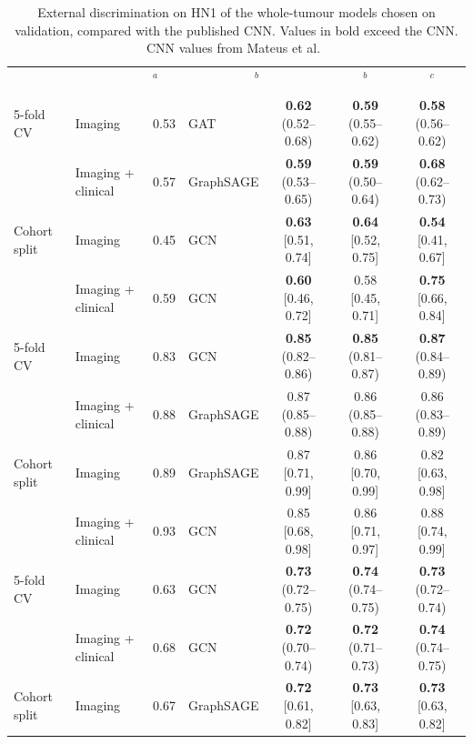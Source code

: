 \begin{table}[!tp]
\centering
\caption{External discrimination on HN1 of the whole-tumour models chosen on validation, compared with the published CNN. Values in bold exceed the CNN. CNN values from Mateus et al.~\cite{mateus2023}}\label{tab:main}
\tabsetup
\begin{tabularx}{\textwidth}{Q{1.9cm} Q{2.6cm} P{1.2cm} Q{1.7cm} C C C}
\toprule
 & & $^{a}$ &  & $^{b}$ & $^{c}$ \\
\cmidrule(lr){4-5}
 &  &  &  &  &  &  \\
\midrule
{}
5-fold CV & Imaging & 0.53 & GAT & \textbf{0.62} (0.52--0.68) & \textbf{0.59} (0.55--0.62) & \textbf{0.58} (0.56--0.62) \\
 & Imaging + clinical & 0.57 & GraphSAGE & \textbf{0.59} (0.53--0.65) & \textbf{0.59} (0.50--0.64) & \textbf{0.68} (0.62--0.73) \\
Cohort split & Imaging & 0.45 & GCN & \textbf{0.63} [0.51, 0.74] & \textbf{0.64} [0.52, 0.75] & \textbf{0.54} [0.41, 0.67] \\
 & Imaging + clinical & 0.59 & GCN & \textbf{0.60} [0.46, 0.72] & 0.58 [0.45, 0.71] & \textbf{0.75} [0.66, 0.84] \\
5-fold CV & Imaging & 0.83 & GCN & \textbf{0.85} (0.82--0.86) & \textbf{0.85} (0.81--0.87) & \textbf{0.87} (0.84--0.89) \\
 & Imaging + clinical & 0.88 & GraphSAGE & 0.87 (0.85--0.88) & 0.86 (0.85--0.88) & 0.86 (0.83--0.89) \\
Cohort split & Imaging & 0.89 & GraphSAGE & 0.87 [0.71, 0.99] & 0.86 [0.70, 0.99] & 0.82 [0.63, 0.98] \\
 & Imaging + clinical & 0.93 & GCN & 0.85 [0.68, 0.98] & 0.86 [0.71, 0.97] & 0.88 [0.74, 0.99] \\
5-fold CV & Imaging & 0.63 & GCN & \textbf{0.73} (0.72--0.75) & \textbf{0.74} (0.74--0.75) & \textbf{0.73} (0.72--0.74) \\
 & Imaging + clinical & 0.68 & GCN & \textbf{0.72} (0.70--0.74) & \textbf{0.72} (0.71--0.73) & \textbf{0.74} (0.74--0.75) \\
Cohort split & Imaging & 0.67 & GraphSAGE & \textbf{0.72} [0.61, 0.82] & \textbf{0.73} [0.63, 0.83] & \textbf{0.73} [0.63, 0.82] \\

\end{tabularx}
\end{table}
